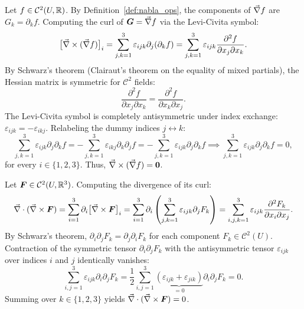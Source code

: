 \begin{demonstration}
Let $f \in \mathcal{C}^2(U, \mathbb{R})$. By Definition~\ref{def:nabla_ops}, the components of $\vec{\nabla} f$ are $G_k = \partial_k f$. Computing the curl of $\bm{G} = \vec{\nabla} f$ via the Levi-Civita symbol:
\begin{equation*}
    \bigl[ \vec{\nabla}\times (\vec{\nabla} f) \bigr]_i = \sum_{j,k=1}^3 \varepsilon_{ijk} \partial_j (\partial_k f) = \sum_{j,k=1}^3 \varepsilon_{ijk} \frac{\partial^2 f}{\partial x_j \partial x_k}.
\end{equation*}
By Schwarz's theorem (Clairaut's theorem on the equality of mixed partials), the Hessian matrix is symmetric for $\mathcal{C}^2$ fields:
\begin{equation*}
    \frac{\partial^2 f}{\partial x_j \partial x_k} = \frac{\partial^2 f}{\partial x_k \partial x_j}.
\end{equation*}
The Levi-Civita symbol is completely antisymmetric under index exchange: $\varepsilon_{ijk} = -\varepsilon_{ikj}$. Relabeling the dummy indices $j \leftrightarrow k$:
\begin{equation*}
    \sum_{j,k=1}^3 \varepsilon_{ijk} \partial_j \partial_k f = -\sum_{j,k=1}^3 \varepsilon_{ikj} \partial_k \partial_j f = -\sum_{j,k=1}^3 \varepsilon_{ijk} \partial_j \partial_k f \implies \sum_{j,k=1}^3 \varepsilon_{ijk} \partial_j \partial_k f = 0,
\end{equation*}
for every $i \in \{1, 2, 3\}$. Thus, $\vec{\nabla}\times (\vec{\nabla} f) = \bm{0}$.
\end{demonstration}

\begin{demonstration}
Let $\bm{F} \in \mathcal{C}^2(U, \mathbb{R}^3)$. Computing the divergence of its curl:
\begin{equation*}
    \vec{\nabla}\cdot (\vec{\nabla}\times \bm{F}) = \sum_{i=1}^3 \partial_i \bigl[ \vec{\nabla}\times \bm{F} \bigr]_i = \sum_{i=1}^3 \partial_i \left( \sum_{j,k=1}^3 \varepsilon_{ijk} \partial_j F_k \right) = \sum_{i,j,k=1}^3 \varepsilon_{ijk} \frac{\partial^2 F_k}{\partial x_i \partial x_j}.
\end{equation*}
By Schwarz's theorem, $\partial_i \partial_j F_k = \partial_j \partial_i F_k$ for each component $F_k \in \mathcal{C}^2(U)$. Contraction of the symmetric tensor $\partial_i \partial_j F_k$ with the antisymmetric tensor $\varepsilon_{ijk}$ over indices $i$ and $j$ identically vanishes:
\begin{equation*}
    \sum_{i,j=1}^3 \varepsilon_{ijk} \partial_i \partial_j F_k = \frac{1}{2} \sum_{i,j=1}^3 \underbrace{(\varepsilon_{ijk} + \varepsilon_{jik})}_{= 0} \partial_i \partial_j F_k = 0.
\end{equation*}
Summing over $k \in \{1, 2, 3\}$ yields $\vec{\nabla}\cdot (\vec{\nabla}\times \bm{F}) = 0$.
\end{demonstration}

